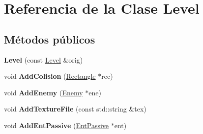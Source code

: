 \hypertarget{classLevel}{\section{Referencia de la Clase Level}
\label{classLevel}
}
\subsection*{Métodos públicos}
\begin{DoxyCompactItemize}
\item 
\hypertarget{classLevel_a620784c827607a855d4d6c8ac57755fa}{{\bfseries Level} (const \hyperlink{classLevel}{Level} \&orig)}\label{classLevel_a620784c827607a855d4d6c8ac57755fa}

\item 
\hypertarget{classLevel_a47703bc5d74e09ca0d9e19db6530c276}{void {\bfseries Add\-Colision} (\hyperlink{classRectangle}{Rectangle} $\ast$rec)}\label{classLevel_a47703bc5d74e09ca0d9e19db6530c276}

\item 
\hypertarget{classLevel_a4197a79686e3079c1be278a9244cf5b8}{void {\bfseries Add\-Enemy} (\hyperlink{classEnemy}{Enemy} $\ast$ene)}\label{classLevel_a4197a79686e3079c1be278a9244cf5b8}

\item 
\hypertarget{classLevel_a8bba26b73e78c54b70dc007be8881dbe}{void {\bfseries Add\-Texture\-File} (const std\-::string \&tex)}\label{classLevel_a8bba26b73e78c54b70dc007be8881dbe}

\item 
\hypertarget{classLevel_acf244a04ef87064f13f29e73ca64679c}{void {\bfseries Add\-Ent\-Passive} (\hyperlink{classEntPassive}{Ent\-Passive} $\ast$ent)}\label{classLevel_acf244a04ef87064f13f29e73ca64679c}

\end{DoxyCompactItemize}
